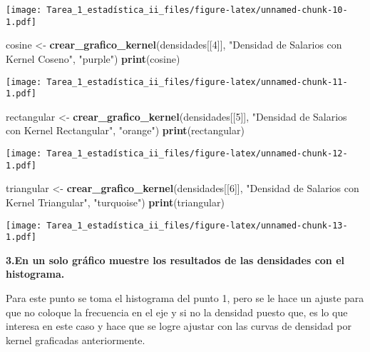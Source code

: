 \documentclass[
]{article}
\newenvironment{Shaded}{\begin{snugshade}}{\end{snugshade}}
\newcommand{\DecValTok}[1]{\textcolor[rgb]{0.00,0.00,0.81}{#1}}
\newcommand{\FunctionTok}[1]{\textcolor[rgb]{0.13,0.29,0.53}{\textbf{#1}}}
\newcommand{\NormalTok}[1]{#1}
\newcommand{\OtherTok}[1]{\textcolor[rgb]{0.56,0.35,0.01}{#1}}
\newcommand{\StringTok}[1]{\textcolor[rgb]{0.31,0.60,0.02}{#1}}
\begin{document}
\texttt{[image: Tarea\_1\_estadística\_ii\_files/figure-latex/unnamed-chunk-10-1.pdf]}

\begin{Shaded}
\begin{Highlighting}[]
\NormalTok{cosine }\OtherTok{\textless{}{-}} \FunctionTok{crear\_grafico\_kernel}\NormalTok{(densidades[[}\DecValTok{4}\NormalTok{]], }
                               \StringTok{"Densidad de Salarios con Kernel Coseno"}\NormalTok{, }\StringTok{"purple"}\NormalTok{)}
\FunctionTok{print}\NormalTok{(cosine)}
\end{Highlighting}
\end{Shaded}

\texttt{[image: Tarea\_1\_estadística\_ii\_files/figure-latex/unnamed-chunk-11-1.pdf]}

\begin{Shaded}
\begin{Highlighting}[]
\NormalTok{rectangular }\OtherTok{\textless{}{-}} \FunctionTok{crear\_grafico\_kernel}\NormalTok{(densidades[[}\DecValTok{5}\NormalTok{]], }
                                    \StringTok{"Densidad de Salarios con Kernel Rectangular"}\NormalTok{, }\StringTok{"orange"}\NormalTok{)}
\FunctionTok{print}\NormalTok{(rectangular)}
\end{Highlighting}
\end{Shaded}

\texttt{[image: Tarea\_1\_estadística\_ii\_files/figure-latex/unnamed-chunk-12-1.pdf]}

\begin{Shaded}
\begin{Highlighting}[]
\NormalTok{triangular }\OtherTok{\textless{}{-}} \FunctionTok{crear\_grafico\_kernel}\NormalTok{(densidades[[}\DecValTok{6}\NormalTok{]], }
                                   \StringTok{"Densidad de Salarios con Kernel Triangular"}\NormalTok{, }\StringTok{"turquoise"}\NormalTok{)}
\FunctionTok{print}\NormalTok{(triangular)}
\end{Highlighting}
\end{Shaded}

\texttt{[image: Tarea\_1\_estadística\_ii\_files/figure-latex/unnamed-chunk-13-1.pdf]}

\textbf{3.En un solo gráfico muestre los resultados de las densidades
con el histograma.}

Para este punto se toma el histograma del punto 1, pero se le hace un
ajuste para que no coloque la frecuencia en el eje y si no la densidad
puesto que, es lo que interesa en este caso y hace que se logre ajustar
con las curvas de densidad por kernel graficadas anteriormente.
\end{document}
